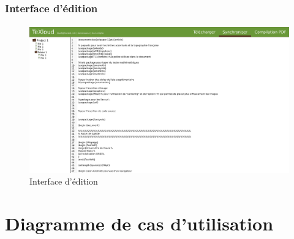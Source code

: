 \documentclass[a4paper,12pt]{article}
\begin{document}
\newpage
\subsubsection{Interface d'édition}
\paragraph{}
\begin{figure}[!ht]
\begin{center}
  \includegraphics[width=1\textwidth, angle=90]{../layout/layout_texloud_std.png}
\end{center}
  \caption{Interface d'édition}
  \label{uiEdit}
\end{figure}

\appendix
\newpage

\section{Diagramme de cas d'utilisation}
\end{document}
